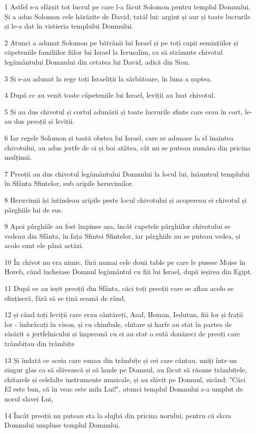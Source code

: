 \par 1 Astfel s-a sfârșit tot lucrul pe care l-a făcut Solomon pentru templul Domnului. Și a adus Solomon cele hărăzite de David, tatăl lui: argint și aur și toate lucrurile și le-a dat în vistieria templului Domnului.
\par 2 Atunci a adunat Solomon pe bătrânii lui Israel și pe toți capii semințiilor și căpeteniile familiilor fiilor lui Israel la Ierusalim, ca să strămute chivotul legământului Domnului din cetatea lui David, adică din Sion.
\par 3 Și s-au adunat la rege toți Israeliții la sărbătoare, în luna a șaptea.
\par 4 După ce au venit toate căpeteniile lui Israel, leviții au luat chivotul.
\par 5 Și au dus chivotul și cortul adunării și toate lucrurile sfinte care erau în cort, le-au dus preoții și leviții.
\par 6 Iar regele Solomon și toată obștea lui Israel, care se adunase la el înaintea chivotului, au adus jertfe de oi și boi atâtea, cât nu se puteau număra din pricina mulțimii.
\par 7 Preoții au dus chivotul legământului Domnului la locul lui, înăuntrul templului în Sfânta Sfintelor, sub aripile heruvimilor.
\par 8 Heruvimii își întindeau aripile peste locul chivotului și acopereau ei chivotul și pârghiile lui de sus.
\par 9 Apoi pârghiile au fost împinse așa, încât capetele pârghiilor chivotului se vedeau din Sfânta, în fața Sfintei Sfintelor, iar pârghiile nu se puteau vedea, și acolo sunt ele până astăzi.
\par 10 În chivot nu era nimic, fără numai cele două table pe care le pusese Moise în Horeb, când încheiase Domnul legământul cu fiii lui Israel, după ieșirea din Egipt.
\par 11 După ce au ieșit preoții din Sfânta, căci toți preoții care se aflau acolo se sfințiseră, fără să se țină seamă de rând,
\par 12 și când toți leviții care erau cântăreți, Asaf, Heman, Iedutun, fiii lor și frații lor - îmbrăcați în vison, și cu chimbale, chitare și harfe au stat în partea de răsărit a jertfelnicului și împreună cu ei au stat o sută douăzeci de preoți care trâmbițau din trâmbițe
\par 13 Și îndată ce aceia care sunau din trâmbițe și cei care cântau, uniți într-un singur glas ca să slăvească și să laude pe Domnul, au făcut să răsune trâmbițele, chitarele și celelalte instrumente muzicale, și au slăvit pe Domnul, zicând: "Căci El este bun, că în veac este mila Lui!", atunci templul Domnului s-a umplut de norul slavei Lui,
\par 14 Încât preoții nu puteau sta la slujbă din pricina norului, pentru că slava Domnului umpluse templul Domnului.


